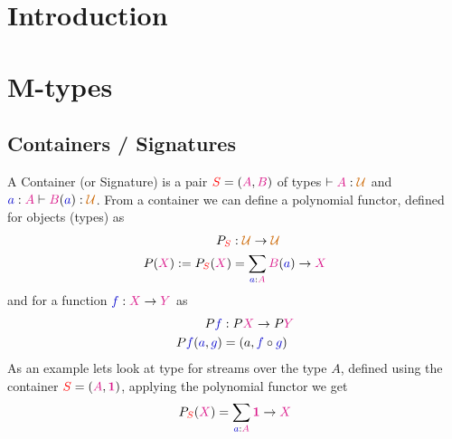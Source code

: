 \documentclass[twoside,11pt,openright]{report}
\newcommand*{\term}[1]{\textcolor{blue!80!black}{#1}}
\newcommand*{\type}[1]{\textcolor{magenta!90!black}{#1}}
\newcommand*{\container}[1]{\textcolor{red}{#1}}
\newcommand*{\universe}[1]{\textcolor{orange!80!black}{#1}}
\newcommand*{\unit}{\type{\textbf{1}}}
\begin{document}
\chapter{Introduction}
\label{ch:intro}




\chapter{M-types}
\label{ch:m-types}

\section{Containers / Signatures}
A Container (or Signature) is a pair \(\container{S} = (\type{A},\type{B})\) of types \(\vdash \type{A} : \universe{\mathcal{U}}\) and \(\term{a} : \type{A} \vdash \type{B}(\term{a}) : \universe{\mathcal{U}}\). From a container we can define a polynomial functor, defined for objects (types) as
\begin{equation}
  \begin{aligned}
    P_{\container{S}} &: \universe{\mathcal{U}} \rightarrow \universe{\mathcal{U}} \\
    P(\type{X}) := P_{\container{S}}(\type{X}) &= \sum_{\term{a} : \type{A}} \type{B}(\term{a}) \rightarrow \type{X}
  \end{aligned}
\end{equation}
and for a function \(\term{f} : \type{X} \rightarrow \type{Y}\) as
\begin{equation}
  \begin{aligned}
    P\term{f} &: P\type{X} \rightarrow P\type{Y} \\
    P\term{f}(\term{a},\term{g}) &= (a, \term{f} \circ \term{g})
  \end{aligned}
\end{equation}
As an example lets look at type for streams over the type \(A\), defined using the container \(\container{S} = (\type{A},\unit)\), applying the polynomial functor we get
\begin{equation}
  P_{\container{S}}(\type{X}) = \sum_{\term{a} : \type{A}} \unit \rightarrow \type{X}
\end{equation}
\end{document}
